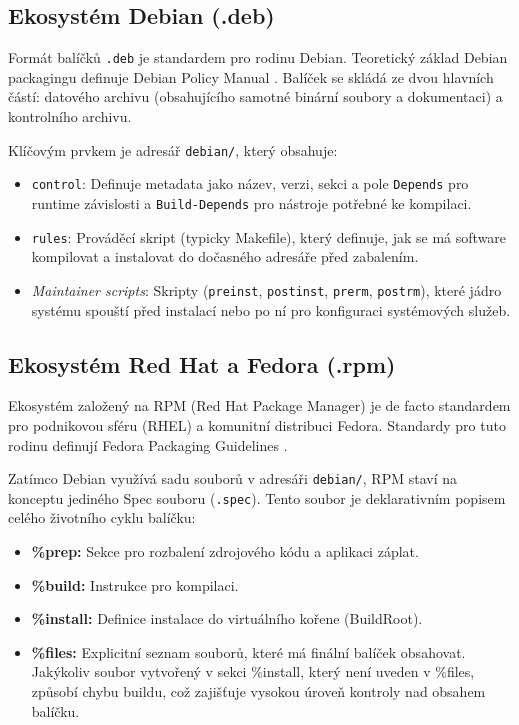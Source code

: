 \subsection{Ekosystém Debian (.deb)}
Formát balíčků \texttt{.deb} je standardem pro rodinu Debian. Teoretický základ Debian packagingu definuje Debian Policy Manual \cite{debian_policy}. Balíček se skládá ze dvou hlavních částí: datového archivu (obsahujícího samotné binární soubory a dokumentaci) a kontrolního archivu.

Klíčovým prvkem je adresář \texttt{debian/}, který obsahuje:
\begin{itemize}
    \item \texttt{control}: Definuje metadata jako název, verzi, sekci a pole \texttt{Depends} pro runtime závislosti a \texttt{Build-Depends} pro nástroje potřebné ke kompilaci.
    \item \texttt{rules}: Prováděcí skript (typicky Makefile), který definuje, jak se má software kompilovat a instalovat do dočasného adresáře před zabalením.
    \item \textit{Maintainer scripts}: Skripty (\texttt{preinst}, \texttt{postinst}, \texttt{prerm}, \texttt{postrm}), které jádro systému spouští před instalací nebo po ní pro konfiguraci systémových služeb.
\end{itemize}

\subsection{Ekosystém Red Hat a Fedora (.rpm)}
Ekosystém založený na RPM (Red Hat Package Manager) je de facto standardem pro podnikovou sféru (RHEL) a komunitní distribuci Fedora. Standardy pro tuto rodinu definují Fedora Packaging Guidelines \cite{fedora_packaging}.

Zatímco Debian využívá sadu souborů v adresáři \texttt{debian/}, RPM staví na konceptu jediného Spec souboru (\texttt{.spec}). Tento soubor je deklarativním popisem celého životního cyklu balíčku:
\begin{itemize}
    \item \textbf{\%prep:} Sekce pro rozbalení zdrojového kódu a aplikaci záplat.
    \item \textbf{\%build:} Instrukce pro kompilaci.
    \item \textbf{\%install:} Definice instalace do virtuálního kořene (BuildRoot).
    \item \textbf{\%files:} Explicitní seznam souborů, které má finální balíček obsahovat. Jakýkoliv soubor vytvořený v sekci \%install, který není uveden v \%files, způsobí chybu buildu, což zajišťuje vysokou úroveň kontroly nad obsahem balíčku.
\end{itemize}

